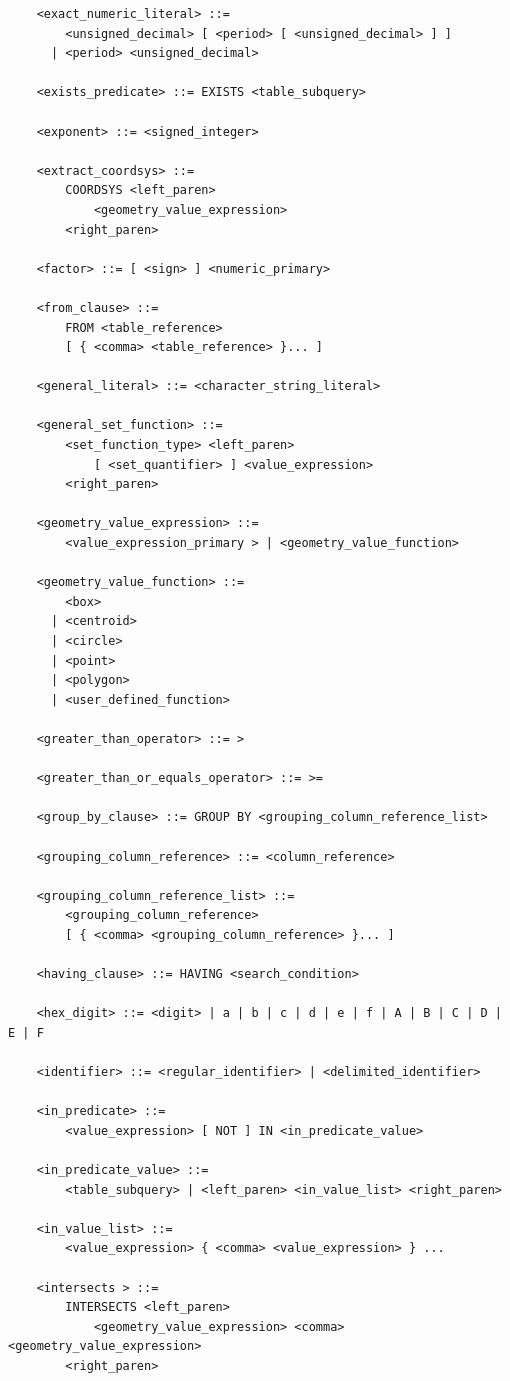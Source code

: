 \documentclass[11pt,a4paper]{ivoa}
\begin{document}
\begin{verbatim}
    <exact_numeric_literal> ::=
        <unsigned_decimal> [ <period> [ <unsigned_decimal> ] ]
      | <period> <unsigned_decimal>

    <exists_predicate> ::= EXISTS <table_subquery>

    <exponent> ::= <signed_integer>

    <extract_coordsys> ::=
        COORDSYS <left_paren>
            <geometry_value_expression>
        <right_paren>

    <factor> ::= [ <sign> ] <numeric_primary>

    <from_clause> ::=
        FROM <table_reference>
	    [ { <comma> <table_reference> }... ]

    <general_literal> ::= <character_string_literal>

    <general_set_function> ::=
        <set_function_type> <left_paren>
            [ <set_quantifier> ] <value_expression>
        <right_paren>

    <geometry_value_expression> ::=
        <value_expression_primary > | <geometry_value_function>

    <geometry_value_function> ::=
        <box>
      | <centroid>
      | <circle>
      | <point>
      | <polygon>
      | <user_defined_function>

    <greater_than_operator> ::= >

    <greater_than_or_equals_operator> ::= >=

    <group_by_clause> ::= GROUP BY <grouping_column_reference_list>

    <grouping_column_reference> ::= <column_reference>

    <grouping_column_reference_list> ::=
        <grouping_column_reference>
        [ { <comma> <grouping_column_reference> }... ]

    <having_clause> ::= HAVING <search_condition>

    <hex_digit> ::= <digit> | a | b | c | d | e | f | A | B | C | D | E | F

    <identifier> ::= <regular_identifier> | <delimited_identifier>

    <in_predicate> ::=
        <value_expression> [ NOT ] IN <in_predicate_value>

    <in_predicate_value> ::=
        <table_subquery> | <left_paren> <in_value_list> <right_paren>

    <in_value_list> ::=
        <value_expression> { <comma> <value_expression> } ...

    <intersects > ::=
        INTERSECTS <left_paren>
            <geometry_value_expression> <comma> <geometry_value_expression>
        <right_paren>


\end{verbatim}
\end{document}
